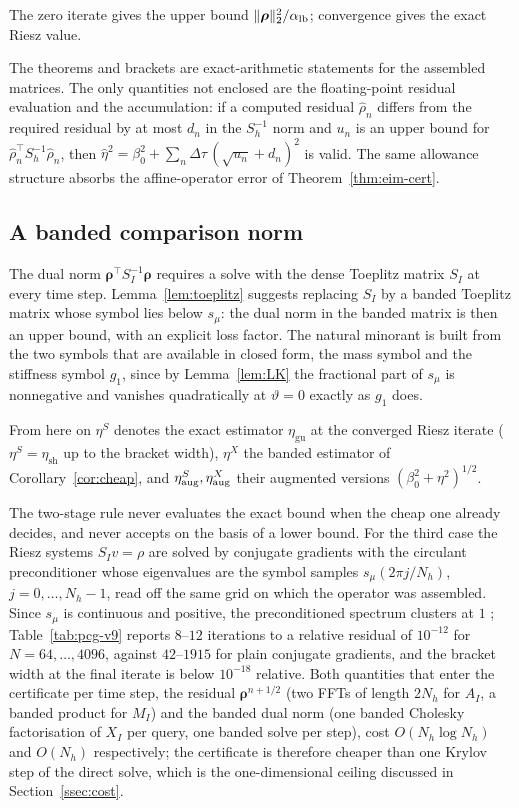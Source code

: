 \documentclass[hidelinks]{siamart251216}
\newcommand{\dt}{\Delta\tau}
\newcommand{\etaSharp}{\eta_{\mathrm{sh}}}
\newcommand{\etaGuar}{\eta_{\mathrm{gu}}}
\newcommand{\rr}{\bm\rho}
\newcommand{\sym}[1]{#1}                 %
\begin{document}
The zero iterate gives the upper bound $\|\rr\|_2^2/\alpha_{\rm lb}$; convergence gives the exact
Riesz value.
\begin{remark}
\label{rem:arithmetic-scope}
The theorems and brackets are exact-arithmetic statements for the assembled matrices.
The only quantities not enclosed are the floating-point residual evaluation and the
accumulation: if a computed residual $\widehat\rho_n$ differs from the required residual by at
most $d_n$ in the $S_h^{-1}$ norm and $u_n$ is an upper bound for
$\widehat\rho_n^\top S_h^{-1}\widehat\rho_n$, then
$\widehat\eta^2=\beta_0^2+\sum_n\dt\,(\sqrt{u_n}+d_n)^2$ is valid.  The same allowance
structure absorbs the affine-operator error of Theorem~\ref{thm:eim-cert}.
\end{remark}
\subsection{A banded comparison norm}
\label{ssec:comparison}
The dual norm $\rr^\top S_I^{-1}\rr$ requires a solve with the dense Toeplitz matrix $S_I$ at
every time step.  Lemma~\ref{lem:toeplitz} suggests replacing $S_I$ by a banded Toeplitz matrix
whose symbol lies below $\sym{s}_\mu$: the dual norm in the banded matrix is then an upper bound,
with an explicit loss factor.  The natural minorant is built from the two symbols that are
available in closed form, the mass symbol and the stiffness symbol $\sym{g}_1$, since by
Lemma~\ref{lem:LK} the fractional part of $\sym{s}_\mu$ is nonnegative and vanishes
quadratically at $\vartheta=0$ exactly as $\sym{g}_1$ does.


From here on $\eta^S$ denotes the exact estimator $\etaGuar$ at the converged Riesz iterate
($\eta^S=\etaSharp$ up to the bracket width), $\eta^X$ the banded estimator of
Corollary~\ref{cor:cheap}, and $\eta^S_{\rm aug},\eta^X_{\rm aug}$ their augmented versions
$(\beta_0^2+\eta^2)^{1/2}$.

The two-stage rule never evaluates the exact bound when the cheap one already decides, and never
accepts on the basis of a lower bound.  For the third case the Riesz systems $S_Iv=\rho$ are
solved by conjugate gradients with the circulant preconditioner whose eigenvalues are the symbol
samples $\sym{s}_\mu(2\pi j/N_h)$, $j=0,\dots,N_h-1$, read off the same grid on which the operator
was assembled.  Since $\sym{s}_\mu$ is continuous and positive, the preconditioned spectrum
clusters at $1$ \cite{ChanStrang1989}; Table~\ref{tab:pcg-v9} reports $8$--$12$ iterations to a
relative residual of $10^{-12}$ for $N=64,\dots,4096$, against $42$--$1915$ for plain conjugate
gradients, and the bracket width at the final iterate is below $10^{-18}$ relative.  Both
quantities that enter the certificate per time step, the residual $\rr^{n+1/2}$ (two FFTs of
length $2N_h$ for $A_I$, a banded product for $M_I$) and the banded dual norm (one banded
Cholesky factorisation of $X_I$ per query, one banded solve per step), cost $O(N_h\log N_h)$ and
$O(N_h)$ respectively; the certificate is therefore cheaper than one Krylov step of the direct
solve, which is the one-dimensional ceiling discussed in Section~\ref{ssec:cost}.
\end{document}
